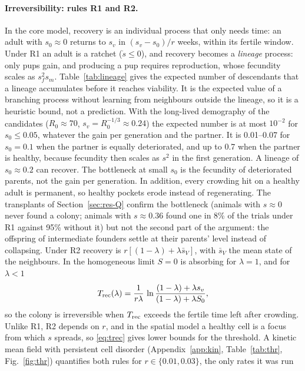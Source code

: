 \paragraph{Irreversibility: rules R1 and R2.}
In the core model, recovery is an individual process that only needs time: an adult with $s_0\approx0$ returns to
$s_v$ in $(s_v-s_0)/r$ weeks, within its fertile window. Under R1 an adult is a ratchet ($\dot s\le0$), and recovery
becomes a \emph{lineage} process: only pups gain, and producing a pup requires reproduction, whose fecundity scales
as $s_f^2s_m$. Table~\ref{tab:lineage} gives the expected number of descendants that a lineage accumulates before
it reaches viability. It is the expected value of a branching process without learning from neighbours outside the
lineage, so it is a heuristic bound, not a prediction. With the long-lived demography of the candidates
($R_0\approx70$, $s_v=R_0^{-1/3}\approx0.24$) the expected number is at most $10^{-2}$ for $s_0\le0.05$, whatever the
gain per generation and the partner. It is 0.01--0.07 for $s_0=0.1$ when the partner is equally deteriorated, and up
to 0.7 when the partner is healthy, because fecundity then scales as $s^2$ in the first generation. A lineage of
$s_0\approx0.2$ can recover. The bottleneck at small $s_0$ is the fecundity of deteriorated parents, not the gain
per generation. In addition, every crowding hit on a healthy adult is permanent, so healthy pockets erode instead of
regenerating. The transplants of Section~\ref{sec:res-Q} confirm the bottleneck (animals with $s\approx0$ never
found a colony; animals with $s\approx0.36$ found one in 8\% of the trials under R1 against 95\% without it) but not
the second part of the argument: the offspring of intermediate founders settle at their parents' level instead of
collapsing.
Under R2 recovery is $r[(1-\lambda)+\lambda\bar s_V]$, with $\bar s_V$ the mean state of the neighbours. In the
homogeneous limit $S=0$ is absorbing for $\lambda=1$, and for $\lambda<1$
\begin{equation}
 T_{\rm rec}(\lambda)=\frac{1}{r\lambda}\,
 \ln\frac{(1-\lambda)+\lambda s_v}{(1-\lambda)+\lambda S_0},
 \label{eq:trec}
\end{equation}
so the colony is irreversible when $T_{\rm rec}$ exceeds the fertile time left after crowding. Unlike R1, R2 depends
on $r$, and in the spatial model a healthy cell is a focus from which $s$ spreads, so \eqref{eq:trec} gives lower
bounds for the threshold. A kinetic mean field with persistent cell disorder (Appendix~\ref{app:kin},
Table~\ref{tab:thr}, Fig.~\ref{fig:thr}) quantifies both rules for $r\in\{0.01,0.03\}$, the only rates it was run

